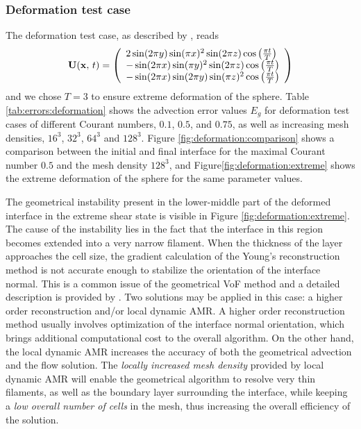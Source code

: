  
\subsubsection{Deformation test case}


The deformation test case, as described by
\citet{HernandezLopezPart1Advection2008}, reads 
%
\begin{align}
    \mathbf U(\mathbf x,\,t) = 
    \left( 
			\begin{array}{l}
			  2 \sin(2\pi y) \sin(\pi x)^2 \sin(2 \pi z) \cos \left(\frac{\pi t}{T}\right)\\
			  -\sin(2\pi x) \sin(\pi y)^2 \sin (2\pi z) \cos \left(\frac{\pi t}{T}\right)\\
			  -\sin(2\pi x) \sin(2 \pi y) \sin (\pi z)^2 \cos \left(\frac{\pi t}{T}\right)
			\end{array} 
    \right)
    \label{equation:deformation-test-case}
\end{align}
%
and we chose $T=3$ to ensure extreme deformation of the sphere. Table
\ref{tab:errors:deformation} shows the advection error values $E_g$ for
deformation test cases of different Courant numbers, $0.1$, $0.5$, and $0.75$,
as well as increasing mesh densities, $16^3$, $32^3$, $64^3$ and $128^3$.
Figure \ref{fig:deformation:comparison} shows a comparison between the initial
and final interface for the maximal Courant number $0.5$ and the mesh density
$128^3$, and Figure\ref{fig:deformation:extreme} shows the extreme deformation
of the sphere for the same parameter values. 

The geometrical instability present in the lower-middle part of the deformed
interface in the extreme shear state is visible in Figure
\ref{fig:deformation:extreme}. The cause of the instability lies in the fact
that the interface in this region becomes extended into a very narrow filament.
When the thickness of the layer approaches the cell size, the gradient
calculation of the Young's reconstruction method is not accurate enough to
stabilize the orientation of the interface normal. This is a common issue of
the geometrical VoF method and a detailed description is provided by
\citet{Cerne2002}. Two solutions may be applied in this case: a higher order
reconstruction and/or local dynamic AMR. A higher order reconstruction method
usually involves optimization of the interface normal orientation, which brings
additional computational cost to the overall algorithm. On the other hand, the
local dynamic AMR increases the accuracy of both the geometrical advection and
the flow solution. The \emph{locally increased mesh density } provided by local
dynamic AMR will enable the geometrical algorithm to resolve very thin
filaments, as well as the boundary layer surrounding the interface, while
keeping a \emph{low overall number of cells} in the mesh, thus increasing the
overall efficiency of the solution. 

